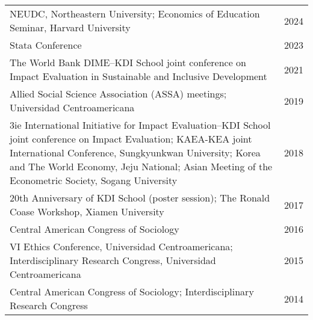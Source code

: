 \documentclass[a4paper,10pt]{article}
\begin{document}
\begin{tabularx}{\textwidth}{@{}X@{\hspace{1em}}r@{}}
  NEUDC, Northeastern University; Economics of Education Seminar, Harvard University & \hfill 2024 \\ 
  Stata Conference & \hfill 2023 \\ 
  The World Bank DIME--KDI School joint conference on Impact Evaluation in Sustainable and Inclusive Development & \hfill 2021 \\ 
  Allied Social Science Association (ASSA) meetings; Universidad Centroamericana & \hfill 2019 \\ 
  3ie International Initiative for Impact Evaluation--KDI School joint conference on Impact Evaluation; KAEA-KEA joint International Conference, Sungkyunkwan University; Korea and The World Economy, Jeju National; Asian Meeting of the Econometric Society, Sogang University & \hfill 2018 \\ 
  20th Anniversary of KDI School (poster session); The Ronald Coase Workshop, Xiamen University & \hfill 2017 \\ 
  Central American Congress of Sociology & \hfill 2016 \\ 
  VI Ethics Conference, Universidad Centroamericana; Interdisciplinary Research Congress, Universidad Centroamericana & \hfill 2015 \\ 
  Central American Congress of Sociology; Interdisciplinary Research Congress & \hfill 2014 \\ 
  \end{tabularx}

\end{document}
